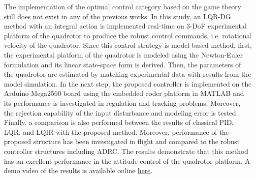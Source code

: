 \documentclass[3p]{elsarticle}
\begin{document}





The implementation of the optimal control category based on the game theory still does not exist in any of the previous works. In this study, an LQR-DG method with an integral action is implemented real-time on 3-DoF experimental platform of the quadrotor to produce the robust control commands, i.e. rotational velocity of the quadrotor. Since this control strategy is model-based method, first, the experimental platform of the quadrotor is modeled using the Newton-Euler formulation and its linear state-space form is derived. Then, the parameters of the quadrotor are estimated by matching experimental data with results from the model simulation. In the next step, the proposed controller is implemented on the Arduino Mega2560 board using the embedded coder platform in MATLAB and its performance is investigated in regulation and tracking problems. Moreover, the rejection capability of the input disturbance and modeling error is tested. Finally, a comparison is also performed between the results of classical PID, LQR, and LQIR with the proposed method. Moreover, performance of the proposed structure has been investigated in flight and compared to the robust controller structures including ADRC. The results demonstrate that this method has an excellent performance in the attitude control of the quadrotor platform. A demo video of the results is available online \href{https://youtu.be/SXZACxGaE1A?si=jxF7Uxh1Ed5-WX1J}{here}.
\end{document}
